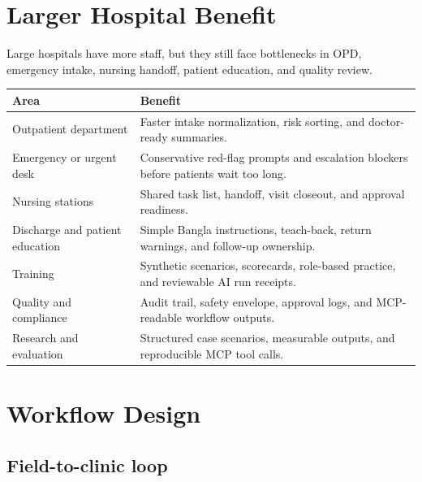 \documentclass[11pt,letterpaper]{article}
\begin{document}
\section{Larger Hospital Benefit}

Large hospitals have more staff, but they still face bottlenecks in OPD, emergency intake, nursing handoff, patient education, and quality review.

\begin{table}[H]
\centering
\begin{tabularx}{\linewidth}{@{}L{2.1in}Y@{}}
\toprule
\textbf{Area} & \textbf{Benefit} \\
\midrule
Outpatient department & Faster intake normalization, risk sorting, and doctor-ready summaries. \\
Emergency or urgent desk & Conservative red-flag prompts and escalation blockers before patients wait too long. \\
Nursing stations & Shared task list, handoff, visit closeout, and approval readiness. \\
Discharge and patient education & Simple Bangla instructions, teach-back, return warnings, and follow-up ownership. \\
Training & Synthetic scenarios, scorecards, role-based practice, and reviewable AI run receipts. \\
Quality and compliance & Audit trail, safety envelope, approval logs, and MCP-readable workflow outputs. \\
Research and evaluation & Structured case scenarios, measurable outputs, and reproducible MCP tool calls. \\
\bottomrule
\end{tabularx}
\end{table}

\section{Workflow Design}

\subsection{Field-to-clinic loop}
\end{document}
